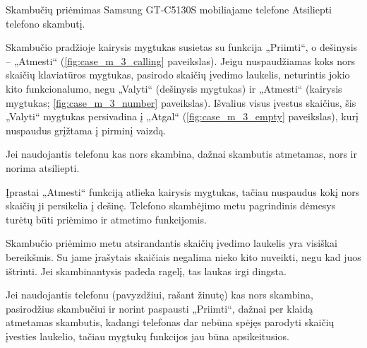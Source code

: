 \begin{xcase}{Skambučių priėmimas Samsung GT-C5130S mobiliajame telefone}
  \xcgoal
  {
    Atsiliepti telefono skambutį.
  }
  
  \xctools
  {
    Skambučio pradžioje kairysis mygtukas susietas su funkcija „Priimti“, o
    dešinysis – „Atmesti“ (\ref{fig:case_m_3_calling} paveikslas). Jeigu nuspaudžiamas
    koks nors skaičių klaviatūros mygtukas, pasirodo skaičių įvedimo laukelis,
    neturintis jokio kito funkcionalumo, negu „Valyti“ (dešinysis mygtukas) ir
    „Atmesti“ (kairysis mygtukas; \ref{fig:case_m_3_number} paveikslas). Išvalius
    visus įvestus skaičius, šis „Valyti“ mygtukas persivadina į „Atgal“
    (\ref{fig:case_m_3_empty} paveikslas), kurį nuspaudus grįžtama į pirminį vaizdą.

  }
  
  \xcresult
  {
    Jei naudojantis telefonu kas nors skambina, dažnai skambutis atmetamas,
    nors ir norima atsiliepti.
  }
  
  \xcprinciples
  {
    {
      Įprastai „Atmesti“ funkciją atlieka kairysis mygtukas, tačiau
      nuspaudus kokį nors skaičių ji persikelia į dešinę. Telefono
      skambėjimo metu pagrindinis dėmesys turėtų būti priėmimo ir atmetimo
      funkcijomis.
    }
  }
  
  \xcthoughts
  {
    Skambučio priėmimo metu atsirandantis skaičių įvedimo laukelis yra
    visiškai bereikšmis. Su jame įrašytais skaičiais negalima nieko kito
    nuveikti, negu kad juos ištrinti. Jei skambinantysis padeda ragelį,
    tas laukas irgi dingsta.

    Jei naudojantis telefonu (pavyzdžiui, rašant žinutę) kas nors skambina,
    pasirodžius skambučiui ir norint paspausti „Priimti“, dažnai per klaidą
    atmetamas skambutis, kadangi telefonas dar nebūna spėjęs parodyti
    skaičių įvesties laukelio, tačiau mygtukų funkcijos jau būna
    apsikeitusios.
  }
\end{xcase}
